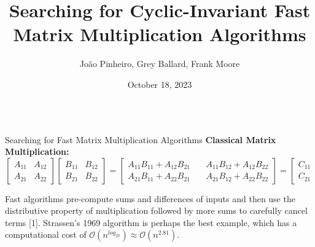 \documentclass[final,hyperref={pdfpagelabels=false}]{beamer}
\title{Searching for Cyclic-Invariant Fast Matrix Multiplication Algorithms}
\author{João Pinheiro, Grey Ballard, Frank Moore}
\institute{Department of Computer Science}
\date{October 18, 2023}
\begin{document}
\begin{frame}[t]

\begin{columns}[t]
    \begin{column}{.5\linewidth}
        \begin{block}{Searching for Fast Matrix Multiplication Algorithms}
        \textbf{Classical Matrix Multiplication:}
            \begin{equation*}
                \begin{bmatrix}
                    A_{11} & A_{12}\\
                    A_{21} & A_{22}
                \end{bmatrix}
                \begin{bmatrix}
                    B_{11} & B_{12}\\
                    B_{21} & B_{22}
                \end{bmatrix}
                =
                \begin{bmatrix}
                    A_{11}B_{11} + A_{12}B_{21} &\ & A_{11}B_{12} + A_{12}B_{22}\\
                    A_{21}B_{11} + A_{22}B_{21} &\ & A_{21}B_{12} + A_{22}B_{22}
                \end{bmatrix}
                =
                \begin{bmatrix}
                    C_{11} & C_{12}\\
                    C_{21} & C_{22}
                \end{bmatrix}
            \end{equation*}
            \begin{center}
            \end{center}
            
            \newline
             Fast algorithms pre-compute sums and differences of inputs and then use the distributive property of multiplication followed by more sums to carefully cancel terms [1]. Strassen's 1969 algorithm is perhaps the best example, which has a computational cost of
            $\mathcal{O}(n^{log_27}) \approx \mathcal{O}(n^{2.81})$.
        \end{block}


\end{column}
\end{columns}
\end{frame}
\end{document}
